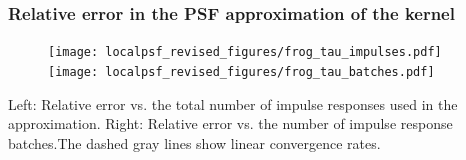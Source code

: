 \documentclass[10pt,final,xcolor=dvipsnames]{beamer}
\newcommand{\impulseresponse}{\phi}
\newcommand{\spatialmean}{\mu}
\newcommand{\Aop}{\mathcal{A}}
\begin{document}
\begin{frame}
  \frametitle{Relative error in the PSF approximation of the kernel}

  \begin{figure}
	\texttt{[image: localpsf\_revised\_figures/frog\_tau\_impulses.pdf]}
	\texttt{[image: localpsf\_revised\_figures/frog\_tau\_batches.pdf]}
  \end{figure}

  \begin{center}
    Left: Relative error vs. the total number of impulse responses
    used in the approximation. Right: Relative error vs. the number of
    impulse response batches.The dashed gray lines show linear
    convergence rates.
  \end{center}
 
\end{frame}
%  
%
%
\end{document}

